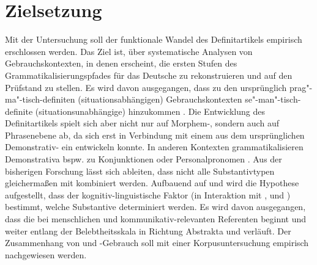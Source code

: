 \section{Zielsetzung} 

Mit der Untersuchung soll der funktionale Wandel des Definitartikels  empirisch erschlossen werden. Das Ziel ist, über systematische Analysen von Gebrauchskontexten, in denen  erscheint, die ersten Stufen des Grammatikalisierungspfades  \parencite{Lehmann2015} für das Deutsche zu rekonstruieren und auf den Prüfstand zu stellen. Es wird davon ausgegangen, dass zu den ursprünglich prag"-ma"-tisch-definiten (situationsabhängigen) Gebrauchskontexten 
 se"-man"-tisch-definite (situationsunabhängige)  hinzukommen \parencite{Lobner1985,Himmelmann1997}. 
Die Entwicklung des Definitartikels spielt sich aber nicht nur auf  Morphem-,  sondern auch auf Phrasenebene  ab, da sich erst in Verbindung mit einem  aus dem ursprünglichen Demonstrativ-  ein  entwickeln konnte. In anderen Kontexten grammatikalisieren Demonstrativa  bspw. zu Konjunktionen  oder Personalpronomen  \parencite{Diessel1999}. Aus der bisherigen Forschung \parencite[u.a.][]{Oubouzar1989,Oubouzar1992}
lässt sich ableiten, dass nicht alle Substantivtypen  gleichermaßen mit  kombiniert werden. Aufbauend auf \textcite{Szczepaniak2011a} und \textcite{Enger2011} wird die Hypothese aufgestellt, dass der kognitiv-linguistische Faktor  (in Interaktion mit ,  und ) bestimmt, welche Substantive  determiniert werden. Es wird davon ausgegangen, dass die  bei menschlichen und kommunikativ-relevanten Referenten beginnt und weiter entlang der Belebtheitsskala  in Richtung Abstrakta  und  verläuft. Der Zusammenhang von  und -Gebrauch soll mit einer Korpusuntersuchung  empirisch nachgewiesen werden.  

